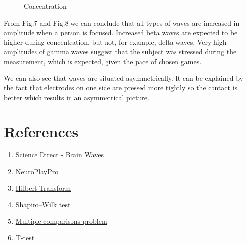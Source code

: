 \documentclass[9pt,twocolumn,twoside]{osajnl}
\begin{document}
\begin{figure}[htbp]
\centering
{}
\caption{Concentration}
\label{fig:false-color}
\end{figure}


From Fig.7 and Fig.8 we can conclude that all types of waves are increased in amplitude when a person is focused. Increased beta waves are expected to be higher during concentration, but not, for example, delta waves. Very high amplitudes of gamma waves suggest that the subject was stressed during the measurement, which is expected, given the pace of chosen games. 

\par We can also see that waves are situated asymmetrically. It can be explained by the fact that electrodes on one side are pressed more tightly so the contact is better which results in an asymmetrical picture.




\section{References}
\begin{enumerate}
    \item \href{https://www.sciencedirect.com/topics/agricultural-and-biological-sciences/brain-waves}{Science Direct - Brain Waves}
    \item \href{https://neuroplay.ru/#braincomputer}{NeuroPlayPro}
    \item \href{http://scholarpedia.org/article/Hilbert_transform_for_brain_waves}{Hilbert Transform}
    \item \href{https://en.wikipedia.org/wiki/Shapiro-Wilk_test}{Shapiro–Wilk test}
    \item \href{https://en.wikipedia.org/wiki/Multiple_comparisons_problem}{Multiple comparisons problem}
    \item \href{https://en.wikipedia.org/wiki/Student's_t-test}{T-test}
\end{enumerate}
\end{document}

